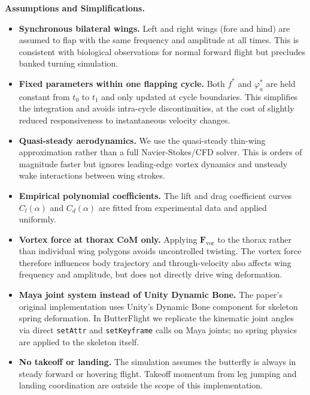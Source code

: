 \documentclass[12pt]{article}
\begin{document}
\textbf{Assumptions and Simplifications.}

\begin{itemize}
  \item \textbf{Synchronous bilateral wings.} Left and right wings (fore and hind)
    are assumed to flap with the same frequency and amplitude at all times.
    This is consistent with biological observations for normal forward flight
    but precludes banked turning simulation.

  \item \textbf{Fixed parameters within one flapping cycle.} Both $f^*$ and
    $\varphi_a^*$ are held constant from $t_0$ to $t_1$ and only updated at
    cycle boundaries. This simplifies the integration and avoids intra-cycle
    discontinuities, at the cost of slightly reduced responsiveness to
    instantaneous velocity changes.

  \item \textbf{Quasi-steady aerodynamics.} We use the quasi-steady thin-wing
    approximation rather than a full Navier-Stokes/CFD solver. This is orders
    of magnitude faster but ignores leading-edge vortex dynamics and
    unsteady wake interactions between wing strokes.

  \item \textbf{Empirical polynomial coefficients.} The lift and drag coefficient
    curves $C_l(\alpha)$ and $C_d(\alpha)$ are fitted from experimental data
    and applied uniformly.

  \item \textbf{Vortex force at thorax CoM only.} Applying $\mathbf{F}_{\mathrm{vor}}$
    to the thorax rather than individual wing polygons avoids uncontrolled twisting.
    The vortex force therefore influences body trajectory and through-velocity
    also affects wing frequency and amplitude, but does not directly drive
    wing deformation.

  \item \textbf{Maya joint system instead of Unity Dynamic Bone.} The paper's
    original implementation uses Unity's Dynamic Bone component for skeleton
    spring deformation. In ButterFlight we replicate the kinematic joint angles
    via direct \texttt{setAttr} and \texttt{setKeyframe} calls on Maya joints;
    no spring physics are applied to the skeleton itself.

  \item \textbf{No takeoff or landing.} The simulation assumes the butterfly is
    always in steady forward or hovering flight. Takeoff momentum from leg jumping
    and landing coordination are outside the scope of this implementation.
\end{itemize}
\end{document}
